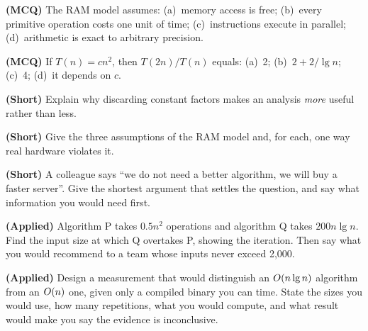 \begin{reviewq}
  \item \textbf{(MCQ)} The RAM model assumes: (a)~memory access is free;
        (b)~every primitive operation costs one unit of time; (c)~instructions
        execute in parallel; (d)~arithmetic is exact to arbitrary precision.
  \item \textbf{(MCQ)} If $T(n) = cn^{2}$, then $T(2n)/T(n)$ equals:
        (a)~2; (b)~$2 + 2/\lg n$; (c)~4; (d)~it depends on $c$.
  \item \textbf{(Short)} Explain why discarding constant factors makes an
        analysis \emph{more} useful rather than less.
  \item \textbf{(Short)} Give the three assumptions of the RAM model and, for
        each, one way real hardware violates it.
  \item \textbf{(Short)} A colleague says ``we do not need a better algorithm,
        we will buy a faster server''. Give the shortest argument that settles
        the question, and say what information you would need first.
  \item \textbf{(Applied)} Algorithm P takes $0.5 n^{2}$ operations and
        algorithm Q takes $200 n \lg n$. Find the input size at which Q
        overtakes P, showing the iteration. Then say what you would recommend
        to a team whose inputs never exceed 2{,}000.
  \item \textbf{(Applied)} Design a measurement that would distinguish an
        $O(n\operatorname{lg} n)$ algorithm from an $O(n)$ one, given only a compiled
        binary you can time. State the sizes you would use, how many
        repetitions, what you would compute, and what result would make you
        say the evidence is inconclusive.
\end{reviewq}
